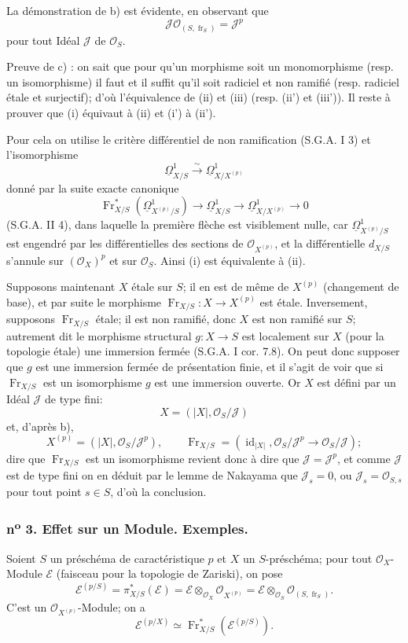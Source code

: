 \documentclass[11pt]{article}
\providecommand{\OO}{\mathcal{O}}
\providecommand{\id}{\operatorname{id}}
\providecommand{\cE}{\mathcal E}
\providecommand{\id}{\operatorname{id}}
\providecommand{\id}{\operatorname{id}}
\providecommand{\id}{\operatorname{id}}
\providecommand{\id}{\operatorname{id}}
\providecommand{\fr}{\operatorname{fr}}
\providecommand{\Fr}{\operatorname{Fr}}
\providecommand{\JJ}{\mathcal J}
\providecommand{\Fr}{\operatorname{Fr}}
\providecommand{\fr}{\operatorname{fr}}
\providecommand{\id}{\operatorname{id}}
\begin{document}
La démonstration de b) est évidente, en observant que
\[
\JJ\OO_{(S,\fr_S)}=\JJ^p
\]
pour tout Idéal $\JJ$ de $\OO_S$.

Preuve de c) : on sait que pour qu'un morphisme soit un
monomorphisme (resp. un isomorphisme) il faut et il suffit qu'il soit radiciel et non ramifié (resp. radiciel étale et surjectif); d'où l'équivalence de (ii) et (iii) (resp. (ii') et (iii')). Il reste à prouver que (i) équivaut à (ii) et (i') à (ii').

Pour cela on utilise le critère différentiel de non ramification (S.G.A. I 3) et l'isomorphisme
\[
\underline{\Omega}^1_{X/S}\xrightarrow{\sim} \underline{\Omega}^1_{X/X^{(p)}}
\]
donné par la suite exacte canonique
\[
\Fr_{X/S}^*(\underline{\Omega}^1_{X^{(p)}/S})\longrightarrow \underline{\Omega}^1_{X/S}
\longrightarrow \underline{\Omega}^1_{X/X^{(p)}}\longrightarrow 0
\]
(S.G.A. II 4), dans laquelle la première flèche est visiblement nulle, car $\underline{\Omega}^1_{X^{(p)}/S}$ est engendré par les différentielles des sections de $\OO_{X^{(p)}}$, et la différentielle $d_{X/S}$ s'annule sur $(\OO_X)^p$ et sur $\OO_S$. Ainsi (i) est équivalente à (ii).

Supposons maintenant $X$ étale sur $S$; il en est de même de $X^{(p)}$ (changement de base), et par suite le morphisme $\Fr_{X/S}:X\to X^{(p)}$ est étale. Inversement, supposons $\Fr_{X/S}$ étale; il est non ramifié, donc $X$ est non ramifié sur $S$; autrement dit le morphisme structural $g:X\to S$ est localement sur $X$ (pour la topologie étale) une immersion fermée (S.G.A. I cor. 7.8). On peut donc supposer que $g$ est une immersion fermée de présentation finie, et il s'agit de voir que si $\Fr_{X/S}$ est un isomorphisme $g$ est une immersion ouverte. Or $X$ est défini par un Idéal $\JJ$ de type fini:
\[
X=(|X|,\OO_S/\JJ)
\]
et, d'après b),
\[
X^{(p)}=(|X|,\OO_S/\JJ^p),
\qquad
\Fr_{X/S}=(\id_{|X|},\OO_S/\JJ^p\to\OO_S/\JJ);
\]
dire que $\Fr_{X/S}$ est un isomorphisme revient donc à dire que $\JJ=\JJ^p$, et comme $\JJ$ est de type fini on en déduit par le lemme de Nakayama que $\JJ_s=0$, ou $\JJ_s=\OO_{S,s}$ pour tout point $s\in S$, d'où la conclusion.

\subsubsection*{n\textsuperscript{o} 3. Effet sur un Module. Exemples.}

Soient $S$ un préschéma de caractéristique $p$ et $X$ un $S$-préschéma; pour tout $\OO_X$-Module $\cE$ (faisceau pour la topologie de Zariski), on pose
\[
\cE^{(p/S)}=\pi_{X/S}^*(\cE)=\cE\otimes_{\OO_X}\OO_{X^{(p)}}
 =\cE\otimes_{\OO_S}\OO_{(S,\fr_S)}.
\]
C'est un $\OO_{X^{(p)}}$-Module; on a
\[
\cE^{(p/X)}\simeq \Fr_{X/S}^*(\cE^{(p/S)}).
\]
\end{document}
